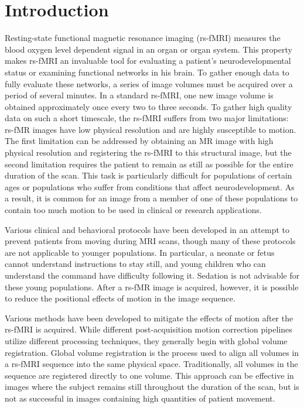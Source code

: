 \chapter{Introduction}

Resting-state functional magnetic resonance imaging (rs-fMRI) measures the blood oxygen level dependent signal in an organ or organ system. This property makes rs-fMRI an invaluable tool for evaluating a patient's neurodevelopmental status or examining functional networks in his brain. To gather enough data to fully evaluate these networks, a series of image volumes must be acquired over a period of several minutes. In a standard rs-fMRI, one new image volume is obtained approximately once every two to three seconds. To gather high quality data on such a short timescale, the rs-fMRI suffers from two major limitations: rs-fMR images have low physical resolution and are highly susceptible to motion. The first limitation can be addressed by obtaining an MR image with high physical resolution and registering the rs-fMRI to this structural image, but the second limitation requires the patient to remain as still as possible for the entire duration of the scan. This task is particularly difficult for populations of certain ages or populations who suffer from conditions that affect neurodevelopment. As a result, it is common for an image from a member of one of these populations to contain too much motion to be used in clinical or research applications.

Various clinical and behavioral protocols have been developed in an attempt to prevent patients from moving during MRI scans, though many of these protocols are not applicable to younger populations. In particular, a neonate or fetus cannot understand instructions to stay still, and young children who can understand the command have difficulty following it. Sedation is not advisable for these young populations. After a rs-fMR image is acquired, however, it is possible to reduce the positional effects of motion in the image sequence.

Various methods have been developed to mitigate the effects of motion after the rs-fMRI is acquired. While different post-acquisition motion correction pipelines utilize different processing techniques, they generally begin with global volume registration. Global volume registration is the process used to align all volumes in a rs-fMRI sequence into the same physical space. Traditionally, all volumes in the sequence are registered directly to one volume. This approach can be effective in images where the subject remains still throughout the duration of the scan, but is not as successful in images containing high quantities of patient movement.

